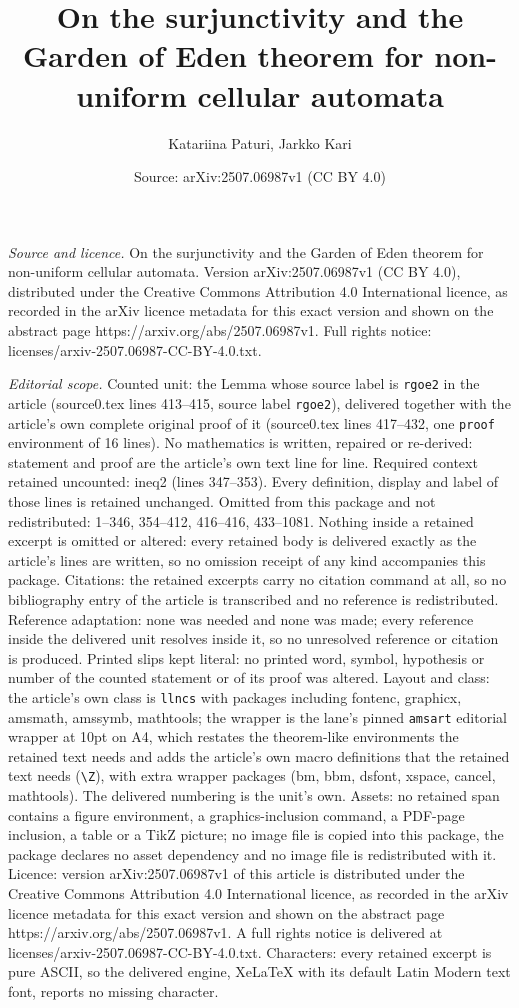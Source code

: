 \documentclass[10pt,a4paper]{amsart}
\title[On the surjunctivity and the Garden of Eden theorem for non-]{On the surjunctivity and the Garden of Eden theorem for non-uniform cellular automata}
\author{Katariina Paturi, Jarkko Kari}
\date{Source: arXiv:2507.06987v1 (CC BY 4.0)}
\begin{document}
\maketitle

\noindent\emph{Source and licence.} On the surjunctivity and the Garden of Eden theorem for non-uniform cellular automata. Version arXiv:2507.06987v1 (CC BY 4.0), distributed under the Creative Commons Attribution 4.0 International licence, as recorded in the arXiv licence metadata for this exact version and shown on the abstract page https://arxiv.org/abs/2507.06987v1. Full rights notice: licenses/arxiv-2507.06987-CC-BY-4.0.txt.\par\smallskip

\noindent\textit{Editorial scope.} Counted unit: the Lemma whose source label is \texttt{rgoe2} in the article (source0.tex lines 413--415, source label \texttt{rgoe2}), delivered together with the article's own complete original proof of it (source0.tex lines 417--432, one \texttt{proof} environment of 16 lines). No mathematics is written, repaired or re-derived: statement and proof are the article's own text line for line. Required context retained uncounted: ineq2 (lines 347--353). Every definition, display and label of those lines is retained unchanged. Omitted from this package and not redistributed: 1--346, 354--412, 416--416, 433--1081. Nothing inside a retained excerpt is omitted or altered: every retained body is delivered exactly as the article's lines are written, so no omission receipt of any kind accompanies this package. Citations: the retained excerpts carry no citation command at all, so no bibliography entry of the article is transcribed and no reference is redistributed. Reference adaptation: none was needed and none was made; every reference inside the delivered unit resolves inside it, so no unresolved reference or citation is produced. Printed slips kept literal: no printed word, symbol, hypothesis or number of the counted statement or of its proof was altered. Layout and class: the article's own class is \texttt{llncs} with packages including fontenc, graphicx, amsmath, amssymb, mathtools; the wrapper is the lane's pinned \texttt{amsart} editorial wrapper at 10pt on A4, which restates the theorem-like environments the retained text needs and adds the article's own macro definitions that the retained text needs (\texttt{\textbackslash Z}), with extra wrapper packages (bm, bbm, dsfont, xspace, cancel, mathtools). The delivered numbering is the unit's own. Assets: no retained span contains a figure environment, a graphics-inclusion command, a PDF-page inclusion, a table or a TikZ picture; no image file is copied into this package, the package declares no asset dependency and no image file is redistributed with it. Licence: version arXiv:2507.06987v1 of this article is distributed under the Creative Commons Attribution 4.0 International licence, as recorded in the arXiv licence metadata for this exact version and shown on the abstract page https://arxiv.org/abs/2507.06987v1. A full rights notice is delivered at licenses/arxiv-2507.06987-CC-BY-4.0.txt. Characters: every retained excerpt is pure ASCII, so the delivered engine, XeLaTeX with its default Latin Modern text font, reports no missing character.
\end{document}
